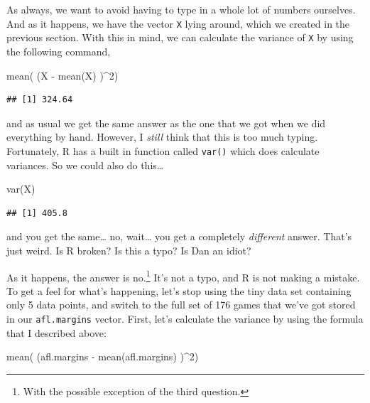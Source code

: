 \documentclass[
]{book}
\newenvironment{Shaded}{\begin{snugshade}}{\end{snugshade}}
\newcommand{\DecValTok}[1]{\textcolor[rgb]{0.00,0.00,0.81}{#1}}
\newcommand{\FunctionTok}[1]{\textcolor[rgb]{0.00,0.00,0.00}{#1}}
\newcommand{\NormalTok}[1]{#1}
\newcommand{\SpecialCharTok}[1]{\textcolor[rgb]{0.00,0.00,0.00}{#1}}
\begin{document}
As always, we want to avoid having to type in a whole lot of numbers ourselves. And as it happens, we have the vector \texttt{X} lying around, which we created in the previous section. With this in mind, we can calculate the variance of \texttt{X} by using the following command,

\begin{Shaded}
\begin{Highlighting}[]
\FunctionTok{mean}\NormalTok{( (X }\SpecialCharTok{{-}} \FunctionTok{mean}\NormalTok{(X) )}\SpecialCharTok{\^{}}\DecValTok{2}\NormalTok{)}
\end{Highlighting}
\end{Shaded}

\begin{verbatim}
## [1] 324.64
\end{verbatim}

and as usual we get the same answer as the one that we got when we did everything by hand. However, I \emph{still} think that this is too much typing. Fortunately, R has a built in function called \texttt{var()} which does calculate variances. So we could also do this\ldots{}

\begin{Shaded}
\begin{Highlighting}[]
\FunctionTok{var}\NormalTok{(X)}
\end{Highlighting}
\end{Shaded}

\begin{verbatim}
## [1] 405.8
\end{verbatim}

and you get the same\ldots{} no, wait\ldots{} you get a completely \emph{different} answer. That's just weird. Is R broken? Is this a typo? Is Dan an idiot?

As it happens, the answer is no.\footnote{With the possible exception of the third question.} It's not a typo, and R is not making a mistake. To get a feel for what's happening, let's stop using the tiny data set containing only 5 data points, and switch to the full set of 176 games that we've got stored in our \texttt{afl.margins} vector. First, let's calculate the variance by using the formula that I described above:

\begin{Shaded}
\begin{Highlighting}[]
\FunctionTok{mean}\NormalTok{( (afl.margins }\SpecialCharTok{{-}} \FunctionTok{mean}\NormalTok{(afl.margins) )}\SpecialCharTok{\^{}}\DecValTok{2}\NormalTok{)}
\end{Highlighting}
\end{Shaded}
\end{document}
